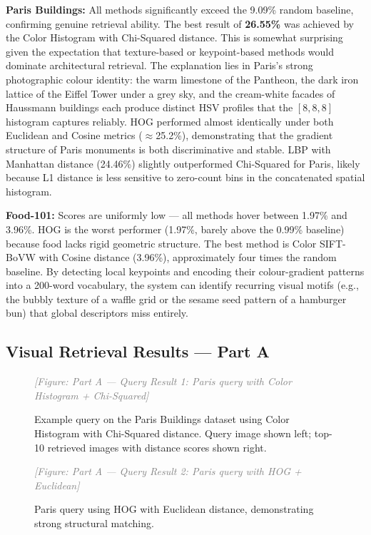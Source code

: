 \documentclass[11pt, a4paper]{article}
\newcommand{\imagebox}[2]{%
  \begin{mdframed}[backgroundcolor=gray!15, linecolor=gray!50, linewidth=1pt]
    \centering
    \vspace{#2}
    \textcolor{gray}{\textit{[Figure: #1]}}
    \vspace{#2}
  \end{mdframed}
}
\begin{document}
\textbf{Paris Buildings:} All methods significantly exceed the 9.09\% random baseline, confirming genuine retrieval ability. The best result of \textbf{26.55\%} was achieved by the Color Histogram with Chi-Squared distance. This is somewhat surprising given the expectation that texture-based or keypoint-based methods would dominate architectural retrieval. The explanation lies in Paris's strong photographic colour identity: the warm limestone of the Pantheon, the dark iron lattice of the Eiffel Tower under a grey sky, and the cream-white facades of Haussmann buildings each produce distinct HSV profiles that the $[8,8,8]$ histogram captures reliably. HOG performed almost identically under both Euclidean and Cosine metrics ($\approx$25.2\%), demonstrating that the gradient structure of Paris monuments is both discriminative and stable. LBP with Manhattan distance (24.46\%) slightly outperformed Chi-Squared for Paris, likely because L1 distance is less sensitive to zero-count bins in the concatenated spatial histogram.

\textbf{Food-101:} Scores are uniformly low — all methods hover between 1.97\% and 3.96\%. HOG is the worst performer (1.97\%, barely above the 0.99\% baseline) because food lacks rigid geometric structure. The best method is Color SIFT-BoVW with Cosine distance (3.96\%), approximately four times the random baseline. By detecting local keypoints and encoding their colour-gradient patterns into a 200-word vocabulary, the system can identify recurring visual motifs (e.g., the bubbly texture of a waffle grid or the sesame seed pattern of a hamburger bun) that global descriptors miss entirely.

\subsection{Visual Retrieval Results — Part A}

\begin{figure}[H]
  \centering
  \imagebox{Part A — Query Result 1: Paris query with Color Histogram + Chi-Squared}{3cm}
  \caption{Example query on the Paris Buildings dataset using Color Histogram with Chi-Squared distance. Query image shown left; top-10 retrieved images with distance scores shown right.}
  \label{fig:partA_paris_1}
\end{figure}

\begin{figure}[H]
  \centering
  \imagebox{Part A — Query Result 2: Paris query with HOG + Euclidean}{3cm}
  \caption{Paris query using HOG with Euclidean distance, demonstrating strong structural matching.}
  \label{fig:partA_paris_2}
\end{figure}
\end{document}
